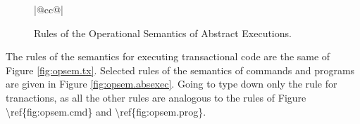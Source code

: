 \begin{figure}
\begin{center}
\begin{tabular}{|@{}cc@{}|}
\hline
{}\\
\hline
\end{tabular}
\end{center}
\caption{Rules of the Operational Semantics of Abstract Executions.}
\end{figure}

The rules of the semantics for executing transactional code are the same of Figure \ref{fig:opsem.tx}.
Selected rules of the semantics of commands and programs are given in Figure \ref{fig:opsem.absexec}. 
\ac{Going to type down only the rule for tranactions, as all the other rules are analogous 
to the rules of Figure \ref{fig:opsem.cmd} and \ref{fig:opsem.prog}.}

